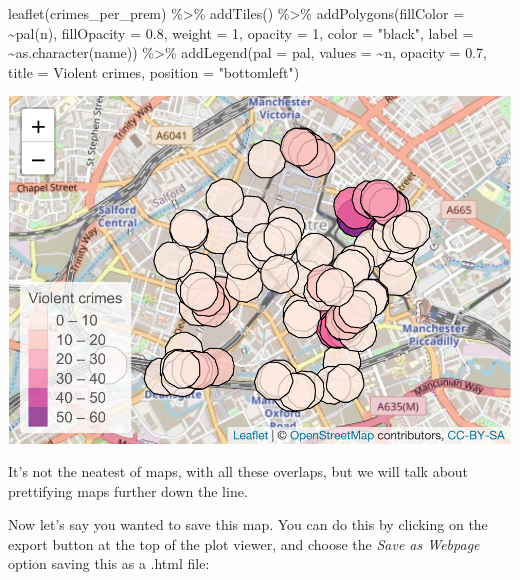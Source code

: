 \documentclass[
]{book}
\newenvironment{Shaded}{\begin{snugshade}}{\end{snugshade}}
\newcommand{\AttributeTok}[1]{\textcolor[rgb]{0.77,0.63,0.00}{#1}}
\newcommand{\DecValTok}[1]{\textcolor[rgb]{0.00,0.00,0.81}{#1}}
\newcommand{\FloatTok}[1]{\textcolor[rgb]{0.00,0.00,0.81}{#1}}
\newcommand{\FunctionTok}[1]{\textcolor[rgb]{0.00,0.00,0.00}{#1}}
\newcommand{\NormalTok}[1]{#1}
\newcommand{\SpecialCharTok}[1]{\textcolor[rgb]{0.00,0.00,0.00}{#1}}
\newcommand{\StringTok}[1]{\textcolor[rgb]{0.31,0.60,0.02}{#1}}
\begin{document}
\begin{Shaded}
\begin{Highlighting}[]
\FunctionTok{leaflet}\NormalTok{(crimes\_per\_prem) }\SpecialCharTok{\%\textgreater{}\%} 
  \FunctionTok{addTiles}\NormalTok{() }\SpecialCharTok{\%\textgreater{}\%} 
  \FunctionTok{addPolygons}\NormalTok{(}\AttributeTok{fillColor =} \SpecialCharTok{\textasciitilde{}}\FunctionTok{pal}\NormalTok{(n), }\AttributeTok{fillOpacity =} \FloatTok{0.8}\NormalTok{,}
              \AttributeTok{weight =} \DecValTok{1}\NormalTok{, }\AttributeTok{opacity =} \DecValTok{1}\NormalTok{, }\AttributeTok{color =} \StringTok{"black"}\NormalTok{,}
              \AttributeTok{label =} \SpecialCharTok{\textasciitilde{}}\FunctionTok{as.character}\NormalTok{(name)) }\SpecialCharTok{\%\textgreater{}\%} 
  \FunctionTok{addLegend}\NormalTok{(}\AttributeTok{pal =}\NormalTok{ pal, }\AttributeTok{values =} \SpecialCharTok{\textasciitilde{}}\NormalTok{n, }\AttributeTok{opacity =} \FloatTok{0.7}\NormalTok{, }
            \AttributeTok{title =} \StringTok{\textquotesingle{}Violent crimes\textquotesingle{}}\NormalTok{, }\AttributeTok{position =} \StringTok{"bottomleft"}\NormalTok{) }
\end{Highlighting}
\end{Shaded}

\includegraphics{crime_mapping_files/figure-latex/unnamed-chunk-52-1.pdf}

It's not the neatest of maps, with all these overlaps, but we will talk about prettifying maps further down the line.

Now let's say you wanted to save this map. You can do this by clicking on the export button at the top of the plot viewer, and choose the \emph{Save as Webpage} option saving this as a .html file:
\end{document}
